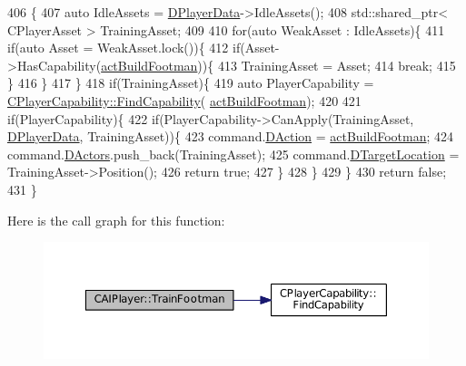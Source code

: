 \begin{DoxyCode}
406                                                           \{
407     \textcolor{keyword}{auto} IdleAssets = \hyperlink{classCAIPlayer_a83b5113c8f7e80df54940b647c5ee2e6}{DPlayerData}->IdleAssets();
408     std::shared\_ptr< CPlayerAsset > TrainingAsset;
409     
410     \textcolor{keywordflow}{for}(\textcolor{keyword}{auto} WeakAsset : IdleAssets)\{
411         \textcolor{keywordflow}{if}(\textcolor{keyword}{auto} Asset = WeakAsset.lock())\{
412             \textcolor{keywordflow}{if}(Asset->HasCapability(\hyperlink{GameDataTypes_8h_a35b98ce26aca678b03c6f9f76e4778cea48885d6af1b7c05c5887978f88556662}{actBuildFootman}))\{
413                 TrainingAsset = Asset;
414                 \textcolor{keywordflow}{break};
415             \}
416         \}
417     \}
418     \textcolor{keywordflow}{if}(TrainingAsset)\{
419         \textcolor{keyword}{auto} PlayerCapability = \hyperlink{classCPlayerCapability_a881ba4b87385d7cfe5cb6ced2d26f226}{CPlayerCapability::FindCapability}(
      \hyperlink{GameDataTypes_8h_a35b98ce26aca678b03c6f9f76e4778cea48885d6af1b7c05c5887978f88556662}{actBuildFootman}); 
420         
421         \textcolor{keywordflow}{if}(PlayerCapability)\{
422             \textcolor{keywordflow}{if}(PlayerCapability->CanApply(TrainingAsset, \hyperlink{classCAIPlayer_a83b5113c8f7e80df54940b647c5ee2e6}{DPlayerData}, TrainingAsset))\{
423                 command.\hyperlink{structSPlayerCommandRequest_a80897bbccf2c4e0b148a7aa815a926c6}{DAction} = \hyperlink{GameDataTypes_8h_a35b98ce26aca678b03c6f9f76e4778cea48885d6af1b7c05c5887978f88556662}{actBuildFootman};
424                 command.\hyperlink{structSPlayerCommandRequest_aa37fc01519676345703d78b9f573894a}{DActors}.push\_back(TrainingAsset);       
425                 command.\hyperlink{structSPlayerCommandRequest_a701702b94ca2fd2738e95ef6711dd41a}{DTargetLocation} = TrainingAsset->Position();
426                 \textcolor{keywordflow}{return} \textcolor{keyword}{true};
427             \}
428         \}
429     \}
430     \textcolor{keywordflow}{return} \textcolor{keyword}{false};
431 \}
\end{DoxyCode}
Here is the call graph for this function\+:
\nopagebreak
\begin{figure}[H]
\begin{center}
\leavevmode
\includegraphics[width=350pt]{classCAIPlayer_aa3f9c1d0d449a45a24e065d2086527b0_cgraph}
\end{center}
\end{figure}
